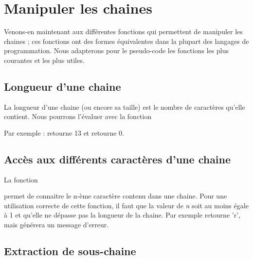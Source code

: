 \section{Manipuler les chaines}

	Venons-en maintenant aux différentes fonctions 
	qui permettent de manipuler les chaines ; 
	ces fonctions ont des formes équivalentes 
	dans la plupart des langages de programmation. 
	Nous adapterons pour le pseudo-code 
	les fonctions les plus courantes et les plus utiles.
	
	\subsection{Longueur d'une chaine}

		La longueur d'une chaine (ou encore sa taille) 
		est le nombre de caractères qu'elle contient. 
		Nous pourrons l'évaluer avec la fonction

		\begin{center}
		\end{center}
	
		Par exemple :  retourne 13 
		et  retourne 0.

	\subsection{Accès aux différents caractères d'une chaine}

		La fonction

		\begin{center}
		\end{center}

		permet de connaitre le n-ème caractère contenu dans une chaine. 
		Pour une utilisation correcte de cette fonction, 
		il faut que la valeur de \textit{n} soit au moins égale à 1 
		et qu'elle ne dépasse pas la longueur de la chaine. 
		Par exemple  retourne 'r', 
		mais  générera un message d'erreur.

	\subsection{Extraction de sous-chaine}

